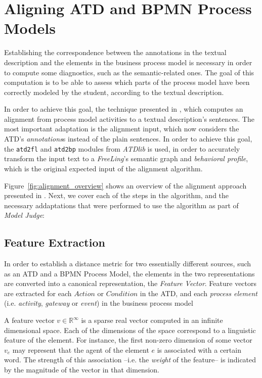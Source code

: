 \section{Aligning ATD and BPMN Process Models}

Establishing the correspondence between the annotations in the textual
description and the elements in the business process model is necessary in order
to compute some diagnostics, such as the semantic-related ones. The goal of this
computation is to be able to assess which parts of the process model have been
correctly modeled by the student, according to the textual description.

In order to achieve this goal, the technique presented in
\cite{10.1007/978-3-319-59536-8_26}, which computes an alignment from process model
activities to a textual description's sentences. The most important adaptation is the
alignment input, which now considers the ATD's \emph{annotations}s instead of
the plain sentences. In order to achieve this goal, the \texttt{atd2fl} and
\texttt{atd2bp} modules from \emph{ATDlib} is used, in order to accurately
transform the input text to a \emph{FreeLing}'s semantic graph and
\emph{behavioral profile}, which is the original expected input of the alignment
algorithm.

Figure~\ref{fig:alignment_overview} shows an overview of the alignment approach
presented in \cite{10.1007/978-3-319-59536-8_26}. Next, we cover each of the
steps in the algorithm, and the necessary addaptations that were performed to
use the algorithm as part of \emph{Model Judge}:

\subsection{Feature Extraction}


In order to establish a distance metric for two essentially different sources, such as
an ATD and a BPMN Process Model, the elements in the two representations are
converted into a canonical representation, the \emph{Feature Vector}. Feature
vectors are extracted for each $Action$ or $Condition$ in the ATD, and each
\emph{process element} (i.e. \emph{activity}, \emph{gateway} or \emph{event}) in
the business process model

A feature vector $v \in \mathbb{R}^\infty$ is a sparse real vector computed in
an infinite dimensional space. Each of the dimensions of the space correspond to
a linguistic feature of the element. For instance, the first non-zero dimension
of some vector $v_e$ may represent that the agent of the element $e$ is
associated with a certain word. The strength of this association --i.e. the
\emph{weight} of the feature-- is indicated by the magnitude of the vector in
that dimension.

